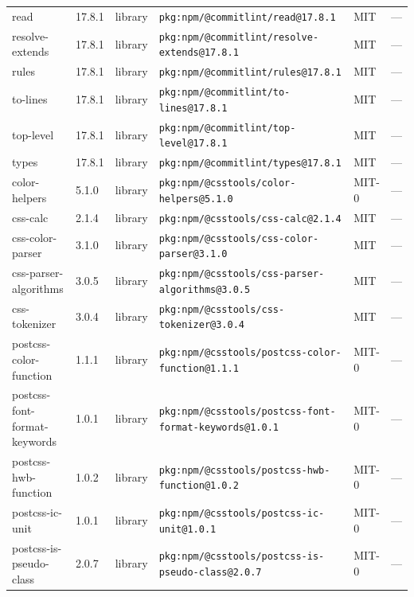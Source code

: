 \documentclass[11pt,a4paper]{article}
\begin{document}
\begin{longtable}{|p{4cm}|p{2cm}|p{1.6cm}|p{5cm}|p{1.5cm}|p{3.5cm}|}
\raggedright read & 17.8.1 & library & \small\texttt{pkg:npm/@commitlint/read@17.8.1} & MIT & \small — \\
\raggedright resolve-extends & 17.8.1 & library & \small\texttt{pkg:npm/@commitlint/resolve-extends@17.8.1} & MIT & \small — \\
\raggedright rules & 17.8.1 & library & \small\texttt{pkg:npm/@commitlint/rules@17.8.1} & MIT & \small — \\
\raggedright to-lines & 17.8.1 & library & \small\texttt{pkg:npm/@commitlint/to-lines@17.8.1} & MIT & \small — \\
\raggedright top-level & 17.8.1 & library & \small\texttt{pkg:npm/@commitlint/top-level@17.8.1} & MIT & \small — \\
\raggedright types & 17.8.1 & library & \small\texttt{pkg:npm/@commitlint/types@17.8.1} & MIT & \small — \\
\raggedright color-helpers & 5.1.0 & library & \small\texttt{pkg:npm/@csstools/color-helpers@5.1.0} & MIT-0 & \small — \\
\raggedright css-calc & 2.1.4 & library & \small\texttt{pkg:npm/@csstools/css-calc@2.1.4} & MIT & \small — \\
\raggedright css-color-parser & 3.1.0 & library & \small\texttt{pkg:npm/@csstools/css-color-parser@3.1.0} & MIT & \small — \\
\raggedright css-parser-algorithms & 3.0.5 & library & \small\texttt{pkg:npm/@csstools/css-parser-algorithms@3.0.5} & MIT & \small — \\
\raggedright css-tokenizer & 3.0.4 & library & \small\texttt{pkg:npm/@csstools/css-tokenizer@3.0.4} & MIT & \small — \\
\raggedright postcss-color-function & 1.1.1 & library & \small\texttt{pkg:npm/@csstools/postcss-color-function@1.1.1} & MIT-0 & \small — \\
\raggedright postcss-font-format-keywords & 1.0.1 & library & \small\texttt{pkg:npm/@csstools/postcss-font-format-keywords@1.0.1} & MIT-0 & \small — \\
\raggedright postcss-hwb-function & 1.0.2 & library & \small\texttt{pkg:npm/@csstools/postcss-hwb-function@1.0.2} & MIT-0 & \small — \\
\raggedright postcss-ic-unit & 1.0.1 & library & \small\texttt{pkg:npm/@csstools/postcss-ic-unit@1.0.1} & MIT-0 & \small — \\
\raggedright postcss-is-pseudo-class & 2.0.7 & library & \small\texttt{pkg:npm/@csstools/postcss-is-pseudo-class@2.0.7} & MIT-0 & \small — \\

\end{longtable}
\end{document}
